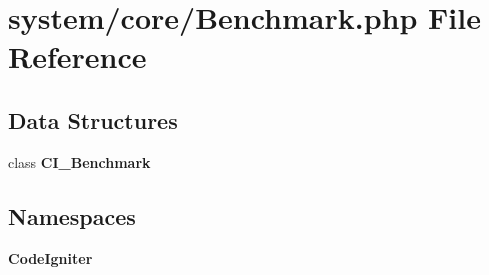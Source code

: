 \section{system/core/\-Benchmark.php File Reference}
\label{_benchmark_8php}
\subsection*{Data Structures}
\begin{DoxyCompactItemize}
\item 
class {\bf C\-I\-\_\-\-Benchmark}
\end{DoxyCompactItemize}
\subsection*{Namespaces}
\begin{DoxyCompactItemize}
\item 
{\bf Code\-Igniter}
\end{DoxyCompactItemize}
